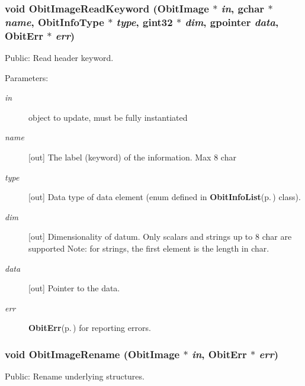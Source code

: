 \subsubsection{\setlength{\rightskip}{0pt plus 5cm}void Obit\-Image\-Read\-Keyword ({\bf Obit\-Image} $\ast$ {\em in}, gchar $\ast$ {\em name}, Obit\-Info\-Type $\ast$ {\em type}, gint32 $\ast$ {\em dim}, gpointer {\em data}, {\bf Obit\-Err} $\ast$ {\em err})}\label{ObitImage_8h_a41}


Public: Read header keyword. 

\begin{Desc}
\item[Parameters:]
\begin{description}
\item[{\em in}]object to update, must be fully instantiated \item[{\em name}][out] The label (keyword) of the information. Max 8 char \item[{\em type}][out] Data type of data element (enum defined in {\bf Obit\-Info\-List}{\rm (p.\,\pageref{structObitInfoList})} class). \item[{\em dim}][out] Dimensionality of datum. Only scalars and strings up to 8 char are supported Note: for strings, the first element is the length in char. \item[{\em data}][out] Pointer to the data. \item[{\em err}]{\bf Obit\-Err}{\rm (p.\,\pageref{structObitErr})} for reporting errors. \end{description}
\end{Desc}
\subsubsection{\setlength{\rightskip}{0pt plus 5cm}void Obit\-Image\-Rename ({\bf Obit\-Image} $\ast$ {\em in}, {\bf Obit\-Err} $\ast$ {\em err})}\label{ObitImage_8h_a22}


Public: Rename underlying structures. 

